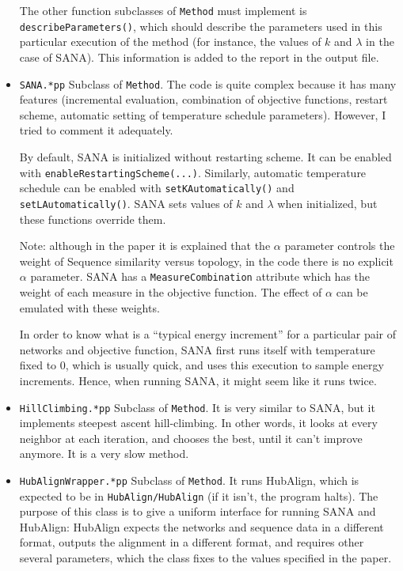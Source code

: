 \documentclass[]{article}
\begin{document}
\begin{itemize}
The other function subclasses of \texttt{Method} must implement is \texttt{describeParameters()}, which should describe the parameters used in this particular execution of the method (for instance, the values of $k$ and $\lambda$ in the case of SANA). This information is added to the report in the output file.

\item \texttt{SANA.*pp} Subclass of \texttt{Method}. The code is quite complex because it has many features (incremental evaluation, combination of objective functions, restart scheme, automatic setting of temperature schedule parameters). However, I tried to comment it adequately.

By default, SANA is initialized without restarting scheme. It can be enabled with \texttt{enableRestartingScheme(...)}. Similarly, automatic temperature schedule can be enabled with \texttt{setKAutomatically()} and \texttt{setLAutomatically()}. SANA sets values of $k$ and $\lambda$ when initialized, but these functions override them.

Note: although in the paper it is explained that the $\alpha$ parameter controls the weight of Sequence similarity versus topology, in the code there is no explicit $\alpha$ parameter. SANA has a \texttt{MeasureCombination} attribute which has the weight of each measure in the objective function. The effect of $\alpha$ can be emulated with these weights.

In order to know what is a ``typical energy increment'' for a particular pair of networks and objective function, SANA first runs itself with temperature fixed to 0, which is usually quick, and uses this execution to sample energy increments. Hence, when running SANA, it might seem like it runs twice.

\item \texttt{HillClimbing.*pp} Subclass of \texttt{Method}. It is very similar to SANA, but it implements steepest ascent hill-climbing. In other words, it looks at every neighbor at each iteration, and chooses the best, until it can't improve anymore. It is a very slow method.

\item \texttt{HubAlignWrapper.*pp} Subclass of \texttt{Method}. It runs HubAlign, which is expected to be in \texttt{HubAlign/HubAlign} (if it isn't, the program halts). The purpose of this class is to give a uniform interface for running SANA and HubAlign: HubAlign expects the networks and sequence data in a different format, outputs the alignment in a different format, and requires other several parameters, which the class fixes to the values specified in the paper.


\end{itemize}
\end{document}
